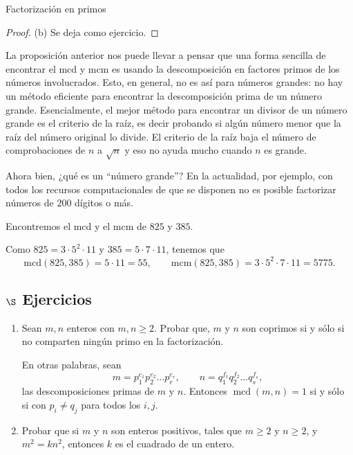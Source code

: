 \begin{section}{Factorización en primos}
\begin{proof}
\noindent(b) Se deja como ejercicio. 
\end{proof}


\begin{observacion} La proposición anterior nos puede llevar a pensar que una forma sencilla de encontrar el mcd y mcm  es usando la descomposición en factores primos de los números involucrados. Esto, en general, no es así para números grandes: no hay un método eficiente para encontrar la descomposición prima de un número grande. Esencialmente, el mejor método para encontrar un divisor de un número grande es el criterio de la raíz, es decir probando si algún número menor que la raíz del número original lo divide. El criterio de la raíz baja el número de comprobaciones de $n$ a $\sqrt{n}$ y eso no ayuda mucho cuando $n$ es grande.

 Ahora bien, ¿qué es un ``número grande''? En la actualidad, por ejemplo, con todos los recursos computacionales de que se disponen no es posible factorizar números de $200$ dígitos o más.     
\end{observacion}


\begin{ejemplo}
Encontremos el mcd y el mcm  de $825$ y $385$.

Como $825 =  3\cdot 5^2\cdot 11$ y $385 = 5\cdot 7\cdot 11$, tenemos que
$$
\text{mcd}(825,385) = 5\cdot 11 = 55, \qquad \text{mcm}(825,385) = 3\cdot 5^2\cdot 7\cdot 11 = 5775.
$$
\end{ejemplo}


\subsection*{\Large $\S$ Ejercicios}
\begin{enumerate}
	\item Sean $m,n$ enteros con $m,n\ge 2$. Probar que,  $m$ y  $n$ son coprimos si y sólo si no comparten ningún primo en la factorización. 
	
	En otras palabras, sean  
	$$
	m=p_1^{e_1}p_2^{e_2}\ldots p_r^{e_r},\qquad
	n=q_1^{f_1}q_2^{f_2}\ldots q_s^{f_s},
	$$ 
	las descomposiciones primas de $m$ y $n$. Entonces  $\operatorname{mcd}(m,n) =1$ si y sólo si con $p_i \not= q_j$ para todos los $i,j$.  
	
\item Probar que si $m$ y $n$ son enteros positivos, tales que $m\ge 2$ y $n \ge 2$, y
$m^2 = kn^2$, entonces $k$ es el cuadrado de un entero.


\end{enumerate}
\end{section}

